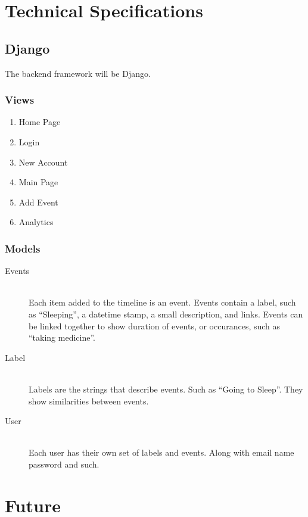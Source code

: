 \documentclass[12pt]{article}
\begin{document}
\section{Technical Specifications}

\subsection{Django}

The backend framework will be Django. 

\subsubsection{Views}

\begin{enumerate}
  \item Home Page
  \item Login
  \item New Account
  \item Main Page
  \item Add Event
  \item Analytics
\end{enumerate}

\subsubsection{Models}

\begin{description}
  \item[Events] \hfill \\
    Each item added to the timeline is an event. Events contain a label, such as ``Sleeping'', a datetime stamp, a small description, and links. Events can be linked together to show duration of events, or occurances, such as ``taking medicine''.
 \item[Label] \hfill \\
  Labels are the strings that describe events. Such as ``Going to Sleep''. They show similarities between events.
 \item[User] \hfill \\
   Each user has their own set of labels and events. Along with email name password and such.
\end{description}

\section{Future}
\end{document}
